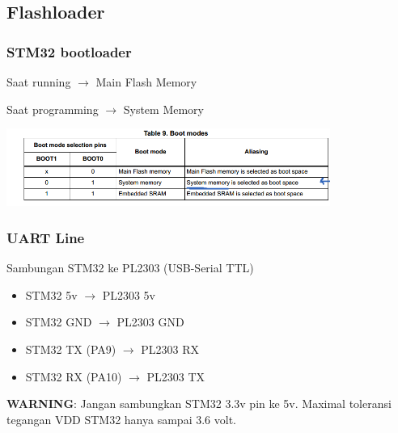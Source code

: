 \documentclass[table,dvipsnames]{beamer}
\begin{document}
	\subsection{Flashloader}
	\begin{frame}
	\frametitle{STM32 bootloader}
		\begin{exampleblock}{}
			Saat running $\rightarrow$ Main Flash Memory
		\end{exampleblock}
		\begin{exampleblock}{}
			Saat programming $\rightarrow$ System Memory
		\end{exampleblock}

		\begin{center}
			\includegraphics[width=300pt]{images/bootloader}
		\end{center}
	\end{frame}

	\begin{frame}
		\frametitle{UART Line}
		\begin{exampleblock}{}
			Sambungan STM32 ke PL2303 (USB-Serial TTL)
			\begin{itemize}
				\item STM32 5v $\rightarrow$ PL2303 5v
				\item STM32 GND $\rightarrow$ PL2303 GND
				\item STM32 TX (PA9) $\rightarrow$ PL2303 RX
				\item STM32 RX (PA10) $\rightarrow$ PL2303 TX
			\end{itemize}
		\end{exampleblock}

		\begin{exampleblock}{}
			\textbf{WARNING}: Jangan sambungkan STM32 3.3v pin ke 5v.
			Maximal toleransi tegangan VDD STM32 hanya sampai 3.6 volt.
		\end{exampleblock}
	\end{frame}
\end{document}
